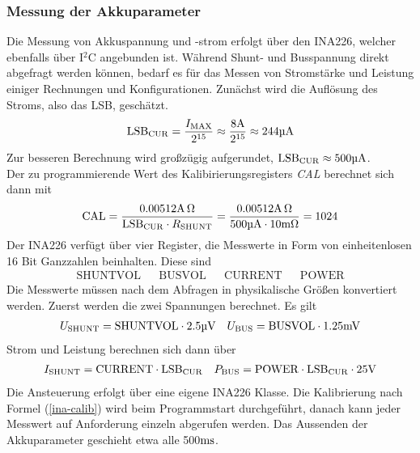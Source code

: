 \documentclass[12pt, a4paper]{report}
\begin{document}
            \subsubsection{Messung der Akkuparameter}\label{ina226-software}
            Die Messung von Akkuspannung und -strom erfolgt über den INA226, welcher ebenfalls über I$^2$C angebunden ist. Während Shunt- und Busspannung direkt abgefragt werden können, bedarf es für das Messen von Stromstärke und Leistung einiger Rechnungen und Konfigurationen.
            Zunächst wird die Auflösung des Stroms, also das LSB, geschätzt.
            \begin{align}
               \mathrm{LSB_{CUR}}=\dfrac{I_{\mathrm{MAX}}}{2^{15}}\approx \dfrac{8\si[]{\ampere}}{2^{15}}\approx 244\si[]{\micro\ampere}
            \end{align}
            Zur besseren Berechnung wird großzügig aufgerundet, $\mathrm{LSB_{CUR}}\approx 500\si[]{\micro\ampere}$.\\
            Der zu programmierende Wert des Kalibirierungsregisters \textit{CAL} berechnet sich dann mit 
            \begin{align}
               \mathrm{CAL}=\dfrac{0.00512\si[]{\ampere\ohm}}{\mathrm{LSB_{CUR}}\cdot R_{\mathrm{SHUNT}}}=\dfrac{0.00512\si[]{\ampere\ohm}}{500\si[]{\micro\ampere}\cdot 10\si[]{\milli\ohm}}=1024\label{ina-calib}
            \end{align}
            Der INA226 verfügt über vier Register, die Messwerte in Form von einheitenlosen 16 Bit Ganzzahlen beinhalten. Diese sind
            \begin{align*}
               \mathrm{SHUNTVOL} && \mathrm{BUSVOL} && \mathrm{CURRENT} && \mathrm{POWER}
            \end{align*}
            Die Messwerte müssen nach dem Abfragen in physikalische Größen konvertiert werden. Zuerst werden die zwei Spannungen berechnet. Es gilt
            \begin{align}
               U_{\mathrm{SHUNT}}=\mathrm{SHUNTVOL}\cdot 2.5\si[]{\micro\volt} && U_{\mathrm{BUS}}=\mathrm{BUSVOL}\cdot 1.25\si[]{\milli\volt}
            \end{align}
            Strom und Leistung berechnen sich dann über
            \begin{align}
               I_{\mathrm{SHUNT}}=\mathrm{CURRENT}\cdot \mathrm{LSB}_{\mathrm{CUR}} && P_{\mathrm{BUS}}=\mathrm{POWER}\cdot \mathrm{LSB}_{\mathrm{CUR}}\cdot 25\si[]{\volt}
            \end{align}
            Die Ansteuerung erfolgt über eine eigene INA226 Klasse. Die Kalibrierung nach Formel (\ref{ina-calib}) wird beim Programmstart durchgeführt, danach kann jeder Messwert auf Anforderung einzeln abgerufen werden.
            Das Aussenden der Akkuparameter geschieht etwa alle 500$\si[]{\milli\second}$.
\end{document}
